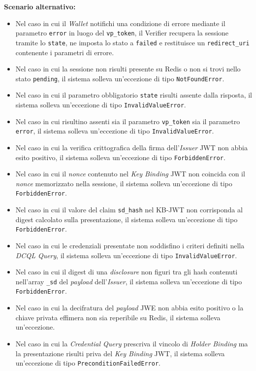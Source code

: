 \noindent\textbf{Scenario alternativo:}
\begin{itemize}
    \item Nel caso in cui il \textit{Wallet} notifichi una condizione di errore mediante il parametro \texttt{error} in luogo del \texttt{vp\_\allowbreak{}token}, il Verifier recupera la sessione tramite lo \texttt{state}, ne imposta lo stato a \texttt{failed} e restituisce un \texttt{redirect\_\allowbreak{}uri} contenente i parametri di errore.
    \item Nel caso in cui la sessione non risulti presente su Redis o non si trovi nello stato \texttt{pending}, il sistema solleva un'eccezione di tipo \texttt{NotFoundError}.
    \item Nel caso in cui il parametro obbligatorio \texttt{state} risulti assente dalla risposta, il sistema solleva un'eccezione di tipo \texttt{InvalidValueError}.
    \item Nel caso in cui risultino assenti sia il parametro \texttt{vp\_\allowbreak{}token} sia il parametro \texttt{error}, il sistema solleva un'eccezione di tipo \texttt{InvalidValueError}.
    \item Nel caso in cui la verifica crittografica della firma dell'\textit{Issuer} JWT non abbia esito positivo, il sistema solleva un'eccezione di tipo \texttt{ForbiddenError}.
    \item Nel caso in cui il \textit{nonce} contenuto nel \textit{Key Binding} JWT non coincida con il \textit{nonce} memorizzato nella sessione, il sistema solleva un'eccezione di tipo \texttt{ForbiddenError}.
    \item Nel caso in cui il valore del claim \texttt{sd\_\allowbreak{}hash} nel KB-JWT non corrisponda al digest calcolato sulla presentazione, il sistema solleva un'eccezione di tipo \texttt{ForbiddenError}.
    \item Nel caso in cui le credenziali presentate non soddisfino i criteri definiti nella \textit{DCQL Query}, il sistema solleva un'eccezione di tipo \texttt{InvalidValueError}.
    \item Nel caso in cui il digest di una \textit{disclosure} non figuri tra gli hash contenuti nell'array \texttt{\_sd} del \textit{payload} dell'\textit{Issuer}, il sistema solleva un'eccezione di tipo \texttt{ForbiddenError}.
    \item Nel caso in cui la decifratura del \textit{payload} JWE non abbia esito positivo o la chiave privata effimera non sia reperibile su Redis, il sistema solleva un'eccezione.
    \item Nel caso in cui la \textit{Credential Query} prescriva il vincolo di \textit{Holder Binding} ma la presentazione risulti priva del \textit{Key Binding} JWT, il sistema solleva un'eccezione di tipo \texttt{PreconditionFailedError}.
\end{itemize}

